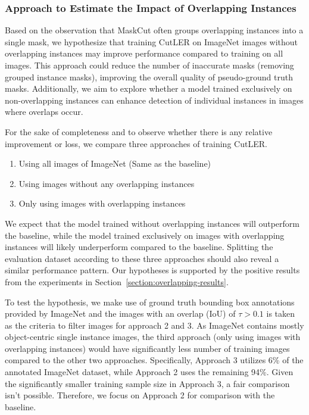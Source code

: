 \subsubsection{Approach to Estimate the Impact of Overlapping Instances}
\label{section:analysis_ol_instancs}

Based on the observation that MaskCut often groups overlapping instances into a single mask, we hypothesize that training CutLER on ImageNet images without overlapping instances may improve performance compared to training on all images. This approach could reduce the number of inaccurate masks (removing grouped instance masks), improving the overall quality of pseudo-ground truth masks. Additionally, we aim to explore whether a model trained exclusively on non-overlapping instances can enhance detection of individual instances in images where overlaps occur.

For the sake of completeness and to observe whether there is any relative improvement or loss, we compare three approaches of training CutLER. 

\begin{enumerate}
	\item Using all images of ImageNet (Same as the baseline)
	\item Using images without any overlapping instances 
	\item Only using images with overlapping instances
\end{enumerate}

We expect that the model trained without overlapping instances will outperform the baseline, while the model trained exclusively on images with overlapping instances will likely underperform compared to the baseline. Splitting the evaluation dataset according to these three approaches should also reveal a similar performance pattern. Our hypotheses is supported by the positive results from the experiments in Section~\ref{section:overlapping-results}.

To test the hypothesis, we make use of ground truth bounding box annotations provided by ImageNet and the images with an overlap (IoU) of \(\tau > \text{0.1}\) is taken as the criteria to filter images for approach 2 and 3. As ImageNet contains mostly object-centric single instance images, the third approach (only using images with overlapping instances) would have significantly less number of training images compared to the other two approaches. Specifically, Approach 3 utilizes 6\% of the annotated ImageNet dataset, while Approach 2 uses the remaining 94\%. Given the significantly smaller training sample size in Approach 3, a fair comparison isn't possible. Therefore, we focus on Approach 2 for comparison with the baseline.


